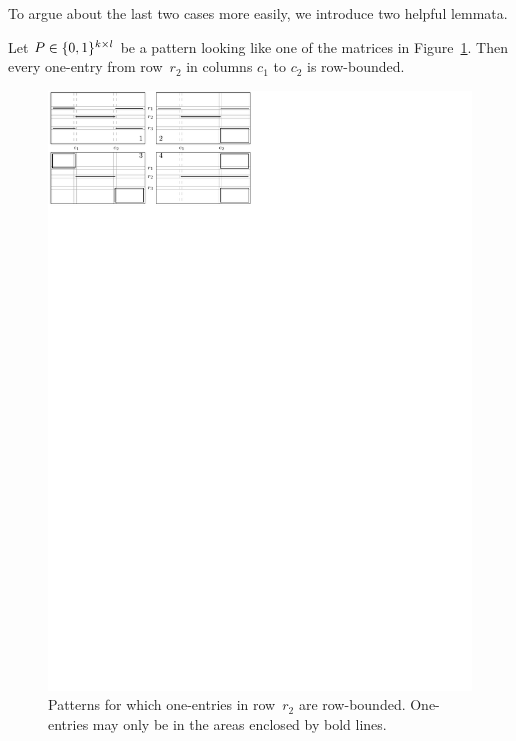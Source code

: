 To argue about the last two cases more easily, we introduce two helpful lemmata.

\begin{lemma}
\label{lemmaH}
Let $P\in\{0,1\}^{k\times l}$ be a pattern looking like one of the matrices in Figure~\ref{lemmaHfig}. Then every one-entry from row~$r_2$ in columns $c_1$ to $c_2$ is row-bounded.

\begin{figure}[!ht]
\centering
\includegraphics[width=\textwidth]{img/lemmaH.pdf}
\caption{Patterns for which one-entries in row~$r_2$ are row-bounded. One-entries may only be in the areas enclosed by bold lines.}
\label{lemmaHfig}
\end{figure}
\end{lemma}
